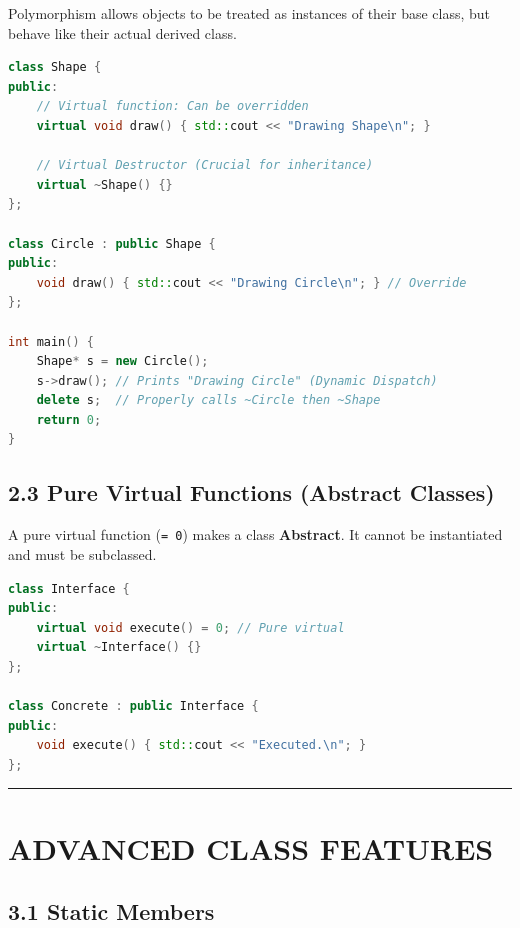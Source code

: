 Polymorphism allows objects to be treated as instances of their base
class, but behave like their actual derived class.

\begin{lstlisting}[language={C++}]
class Shape {
public:
    // Virtual function: Can be overridden
    virtual void draw() { std::cout << "Drawing Shape\n"; }
    
    // Virtual Destructor (Crucial for inheritance)
    virtual ~Shape() {} 
};

class Circle : public Shape {
public:
    void draw() { std::cout << "Drawing Circle\n"; } // Override
};

int main() {
    Shape* s = new Circle();
    s->draw(); // Prints "Drawing Circle" (Dynamic Dispatch)
    delete s;  // Properly calls ~Circle then ~Shape
    return 0;
}
\end{lstlisting}

\hypertarget{pure-virtual-functions-abstract-classes}{%
\subsection{2.3 Pure Virtual Functions (Abstract
Classes)}\label{pure-virtual-functions-abstract-classes}}

A pure virtual function (\passthrough{\lstinline!= 0!}) makes a class
\textbf{Abstract}. It cannot be instantiated and must be subclassed.

\begin{lstlisting}[language={C++}]
class Interface {
public:
    virtual void execute() = 0; // Pure virtual
    virtual ~Interface() {}
};

class Concrete : public Interface {
public:
    void execute() { std::cout << "Executed.\n"; }
};
\end{lstlisting}

\begin{center}\rule{0.5\linewidth}{0.5pt}\end{center}

\hypertarget{advanced-class-features}{%
\section{ADVANCED CLASS FEATURES}\label{advanced-class-features}}

\hypertarget{static-members}{%
\subsection{3.1 Static Members}\label{static-members}}

